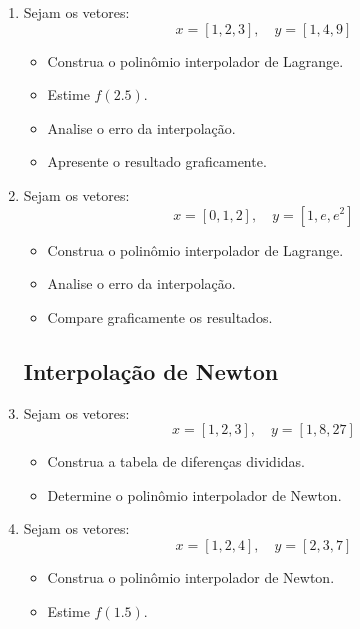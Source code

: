 \begin{enumerate}
\subsection{Interpolação de Lagrange}

\item Sejam os vetores:
\[
x = [1, 2, 3], \quad y = [1, 4, 9]
\]

\begin{itemize}
    \item Construa o polinômio interpolador de Lagrange.
    \item Estime $f(2.5)$.
    \item Analise o erro da interpolação.
    \item Apresente o resultado graficamente.
\end{itemize}

\item Sejam os vetores:
\[
x = [0, 1, 2], \quad y = [1, e, e^2]
\]

\begin{itemize}
    \item Construa o polinômio interpolador de Lagrange.
    \item Analise o erro da interpolação.
    \item Compare graficamente os resultados.
\end{itemize}

\subsection{Interpolação de Newton}

\item Sejam os vetores:
\[
x = [1, 2, 3], \quad y = [1, 8, 27]
\]

\begin{itemize}
    \item Construa a tabela de diferenças divididas.
    \item Determine o polinômio interpolador de Newton.
\end{itemize}

\item Sejam os vetores:
\[
x = [1, 2, 4], \quad y = [2, 3, 7]
\]

\begin{itemize}
    \item Construa o polinômio interpolador de Newton.
    \item Estime $f(1.5)$.
\end{itemize}


\end{enumerate}
